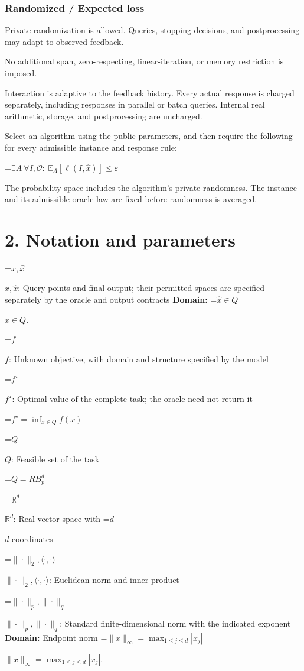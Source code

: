 \documentclass[10pt,a4paper]{article}
\newcommand{\AtlasMath}[1]{\par\begingroup\centering\setbox0=\hbox{$\displaystyle #1$}\ifdim\wd0>1.4\linewidth\typeout{ATLAS WIDE FORMULA: \the\wd0}\fi\ifdim\wd0>\linewidth\resizebox{\linewidth}{!}{\box0}\else\box0\fi\par\endgroup}
\newcommand{\AtlasInlineMath}[1]{\begingroup\setbox0=\hbox{$#1$}\ifdim\wd0>.4\linewidth\endgroup\AtlasMath{#1}\else\endgroup$#1$\fi}
\begin{document}
\subsubsection{Randomized / Expected loss}
Private randomization is allowed. Queries, stopping decisions, and postprocessing may adapt to observed feedback.

No additional span, zero-respecting, linear-iteration, or memory restriction is imposed.

Interaction is adaptive to the feedback history. Every actual response is charged separately, including responses in parallel or batch queries. Internal real arithmetic, storage, and postprocessing are uncharged.

Select an algorithm using the public parameters, and then require the following for every admissible instance and response rule:


\AtlasMath{\exists A\ \forall I,\mathcal{O}:\ \mathbb{E}_A[\ell(I,\widehat{x})]\le\varepsilon}


The probability space includes the algorithm's private randomness. The instance and its admissible oracle law are fixed before randomness is averaged.

\section{2. Notation and parameters}
\AtlasInlineMath{x,\widehat{x}}: Query points and final output; their permitted spaces are specified separately by the oracle and output contracts \textbf{Domain:} \AtlasInlineMath{\widehat{x}\in Q}.

\AtlasInlineMath{f}: Unknown objective, with domain and structure specified by the model

\AtlasInlineMath{f^\star}: Optimal value of the complete task; the oracle need not return it


\AtlasMath{f^\star=\inf_{x\in Q}f(x)}


\AtlasInlineMath{Q}: Feasible set of the task


\AtlasMath{Q=RB_p^d}


\AtlasInlineMath{\mathbb{R}^d}: Real vector space with \AtlasInlineMath{d} coordinates

\AtlasInlineMath{\|\cdot\|_2,\langle\cdot,\cdot\rangle}: Euclidean norm and inner product

\AtlasInlineMath{\|\cdot\|_p,\|\cdot\|_q}: Standard finite-dimensional norm with the indicated exponent \textbf{Domain:} Endpoint norm \AtlasInlineMath{\|x\|_\infty=\max_{1\le j\le d}|x_j|}.
\end{document}
